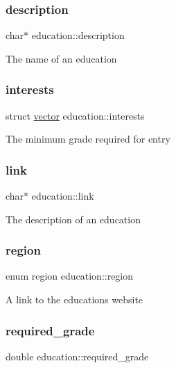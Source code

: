 \subsubsection{\texorpdfstring{description}{description}}
{\footnotesize\ttfamily char$\ast$ education\+::description}

The name of an education \mbox{\label{structeducation_ae8ea10524118581a9ed1a93bafc5cc54}} 
\subsubsection{\texorpdfstring{interests}{interests}}
{\footnotesize\ttfamily struct \hyperlink{structvector}{vector} education\+::interests}

The minimum grade required for entry \mbox{\label{structeducation_a0244d20a4b1f00a6088cece10b77a0f3}} 
\subsubsection{\texorpdfstring{link}{link}}
{\footnotesize\ttfamily char$\ast$ education\+::link}

The description of an education \mbox{\label{structeducation_afbd04b27ec3401b2076f1a2806a4bd42}} 
\subsubsection{\texorpdfstring{region}{region}}
{\footnotesize\ttfamily enum region education\+::region}

A link to the educations website \mbox{\label{structeducation_ab0bb73fcbd8c30cb1be9f01f7fa608cd}} 
\subsubsection{\texorpdfstring{required\+\_\+grade}{required\_grade}}
{\footnotesize\ttfamily double education\+::required\+\_\+grade}

